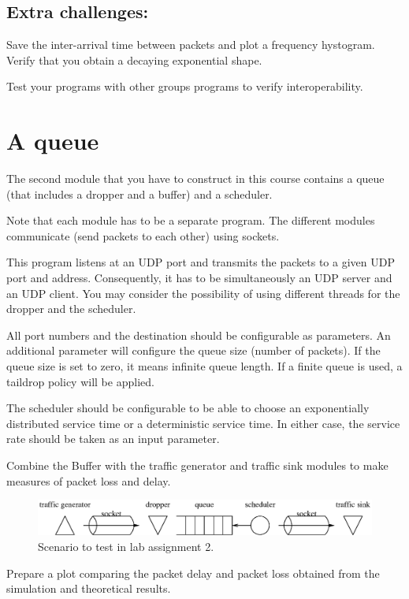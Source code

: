 \subsection{Extra challenges:} 
Save the inter-arrival time between packets and plot a frequency hystogram.
Verify that you obtain a decaying exponential shape.

Test your programs with other groups programs to verify interoperability.


\section{A queue}

The second module that you have to construct in this course contains a queue (that includes a dropper and a buffer) and a scheduler.

Note that each module has to be a separate program. The different modules communicate (send packets to each other) using sockets.

This program listens at an UDP port and transmits the packets to a given UDP port and address. Consequently, it has to be simultaneously an UDP server and an UDP client. You may consider the possibility of using different threads for the dropper and the scheduler.

All port numbers and the destination should be configurable as parameters. An additional parameter will configure the queue size (number of packets). If the queue size is set to zero, it means infinite queue length. If a finite queue is used, a taildrop policy will be applied.

The scheduler should be configurable to be able to choose an exponentially distributed service time or a deterministic service time. In either case, the service rate should be taken as an input parameter.

Combine the Buffer with the traffic generator and traffic sink modules to make measures of packet loss and delay.

\begin{figure}[!h]
\centering
\includegraphics[width=\linewidth]{figures/scenario2.eps}
\caption{Scenario to test in lab assignment 2.}
\label{fig:scenario2}
\end{figure}


Prepare a plot comparing the packet delay and packet loss obtained from the simulation and theoretical results.

